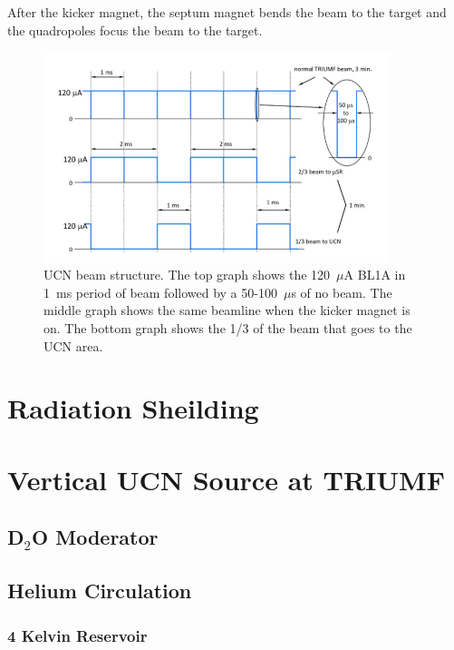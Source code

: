 After the kicker magnet, the septum magnet bends the beam to the
target and the quadropoles focus the beam to the target.


\begin{figure}[h]
  \centering
  \includegraphics[width=0.9\textwidth]{bl1u.png}
  \caption{UCN beam structure. The top graph shows the 120~$\mu$A BL1A
    in 1~ms period of beam followed by a 50-100~$\mu$s of no
    beam. The middle graph shows the same beamline when the kicker
    magnet is on. The bottom graph shows the 1/3 of the beam that goes
    to the UCN area.}
  \label{fig:bl1u}
\end{figure}

\section{Radiation Sheilding}

\section{Vertical UCN Source at TRIUMF\label{vertical_source}}


\subsection{D$_2$O Moderator}

\subsection{Helium Circulation}

\subsubsection{4 Kelvin Reservoir}

